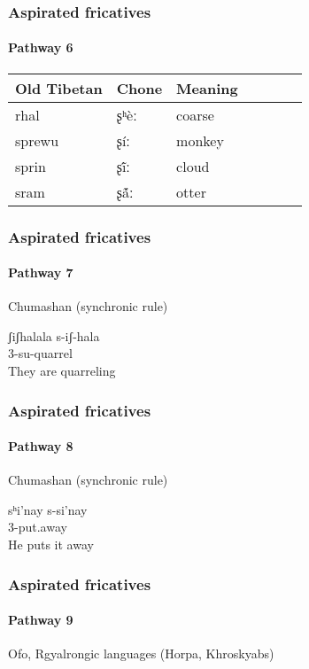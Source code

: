 \documentclass[xcolor=table]{beamer}
\newcommand{\ipa}[1]{{\phon \mbox{#1}}} %
\begin{document}
 
  \begin{frame} 
 \frametitle{Aspirated fricatives} 
 \framesubtitle{Pathway 6}

\begin{table}[H] \centering
\begin{tabular}{lllllll}
\toprule
Old Tibetan&   Chone & Meaning \\
\midrule
rhal & \ipa{ʂʰèː} & coarse \\
sprewu & \ipa{ʂíː} & monkey \\
sprin & \ipa{ʂĩ́ː} & cloud \\
sram & \ipa{ʂã́ː} & otter \\
\bottomrule
\end{tabular}
\end{table}


   \end{frame}   
 

  \begin{frame} 
 \frametitle{Aspirated fricatives} 
 \framesubtitle{Pathway 7}
Chumashan (synchronic rule)

\begin{exe}
\ex 
\glt ʃiʃhalala
\gll s-iʃ-hala \\
3-su-quarrel \\
\glt They are quarreling
\end{exe}

   \end{frame}    

  \begin{frame} 
 \frametitle{Aspirated fricatives} 
 \framesubtitle{Pathway 8}
Chumashan (synchronic rule)

\begin{exe}
\ex 
\glt sʰi'nay
\gll s-si'nay \\
3-put.away \\
\glt He puts it away
\end{exe}

   \end{frame}    

  \begin{frame} 
\frametitle{Aspirated fricatives} 
 \framesubtitle{Pathway 9}

Ofo, Rgyalrongic languages (Horpa, Khroskyabs)
   \end{frame}    
\end{document}
